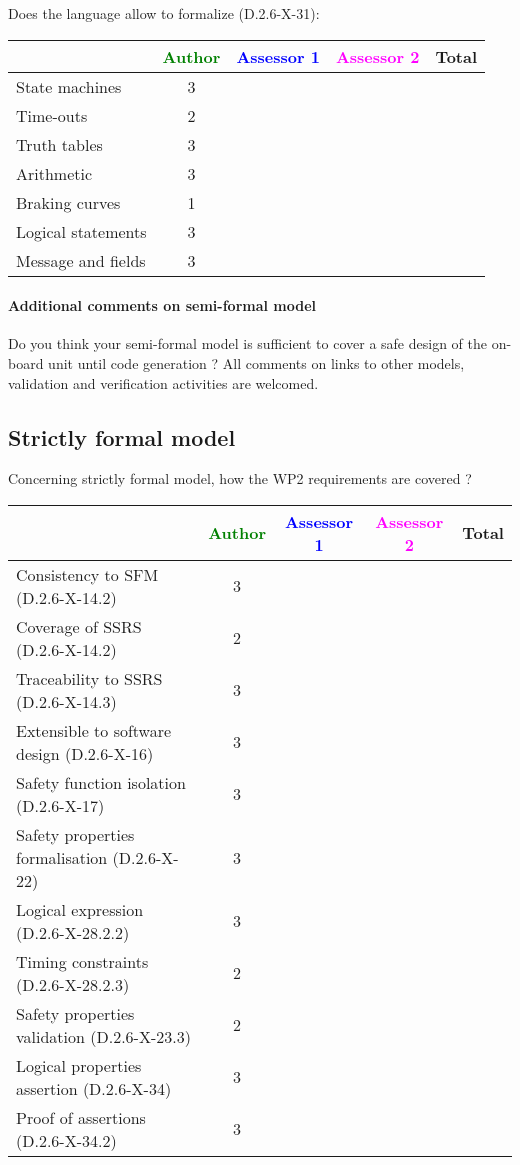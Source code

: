 Does the language allow to  formalize (D.2.6-X-31):

\begin{tabular}{|l | c | c | c | c|}
\hline
& \textcolor{green}{Author} & \textcolor{blue}{Assessor 1} & \textcolor{magenta}{Assessor 2} & Total \\
\hline 
State machines  & 3 & & &  \\
\hline
Time-outs  & 2 & & &  \\
\hline
Truth tables  & 3 & & &  \\
\hline
Arithmetic  & 3 & & &  \\
\hline
Braking curves  & 1 & & &  \\
\hline
Logical statements & 3 & & &  \\
\hline
Message and fields & 3 & & &  \\
\hline
\end{tabular}

\paragraph{Additional comments on semi-formal  model} Do you think your semi-formal  model is sufficient to cover a safe design of the on-board unit until code generation ?
All comments on links to  other models, validation and verification activities are welcomed.

\subsection{Strictly formal model}

Concerning strictly formal model, how the WP2 requirements are covered ?

\begin{tabular}{|l | c | c | c | c|}
\hline
& \textcolor{green}{Author} & \textcolor{blue}{Assessor 1} & \textcolor{magenta}{Assessor 2} & Total \\
\hline 
Consistency to SFM (D.2.6-X-14.2) & 3 & & &  \\
\hline
Coverage of SSRS (D.2.6-X-14.2)  & 2 & & &  \\
\hline
Traceability to  SSRS (D.2.6-X-14.3)  & 3 & & &  \\
\hline
Extensible to software design (D.2.6-X-16)  & 3 & & &  \\
\hline
Safety function isolation (D.2.6-X-17)  & 3 & & &  \\
\hline 
Safety properties formalisation (D.2.6-X-22)  & 3 & & &  \\
\hline
Logical expression (D.2.6-X-28.2.2)  & 3 & & &  \\
\hline
Timing constraints (D.2.6-X-28.2.3)  & 2 & & &  \\
\hline
Safety properties validation (D.2.6-X-23.3)  & 2 & & &  \\
\hline
Logical properties assertion (D.2.6-X-34)  & 3 & & &  \\
\hline
Proof of assertions (D.2.6-X-34.2)  & 3 & & &  \\
\hline
\end{tabular}

